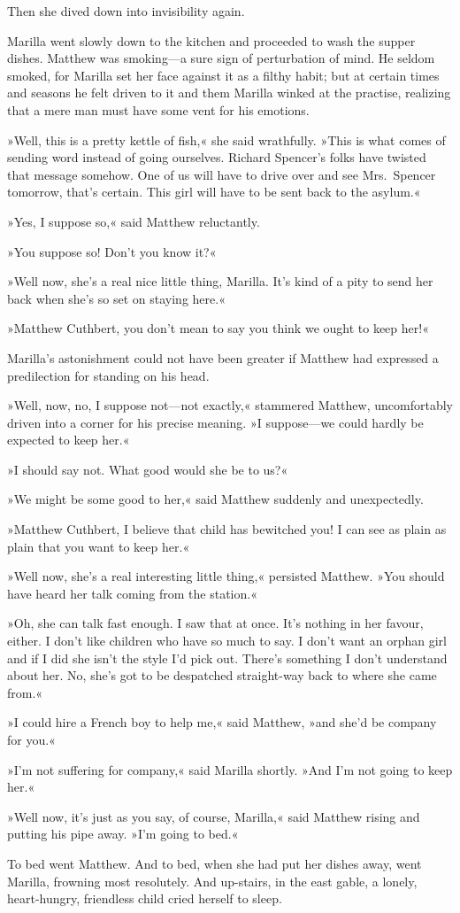 Then she dived down into invisibility again.

Marilla went slowly down to the kitchen and proceeded to wash the supper dishes. Matthew was smoking—a sure sign of perturbation of mind. He seldom smoked, for Marilla set her face against it as a filthy habit; but at certain times and seasons he felt driven to it and them Marilla winked at the practise, realizing that a mere man must have some vent for his emotions.

»Well, this is a pretty kettle of fish,« she said wrathfully. »This is what comes of sending word instead of going ourselves. Richard Spencer's folks have twisted that message somehow. One of us will have to drive over and see Mrs.~Spencer tomorrow, that's certain. This girl will have to be sent back to the asylum.«

»Yes, I suppose so,« said Matthew reluctantly.

»You suppose so! Don't you know it?«

»Well now, she's a real nice little thing, Marilla. It's kind of a pity to send her back when she's so set on staying here.«

»Matthew Cuthbert, you don't mean to say you think we ought to keep her!«

Marilla's astonishment could not have been greater if Matthew had expressed a predilection for standing on his head.

»Well, now, no, I suppose not—not exactly,« stammered Matthew, uncomfortably driven into a corner for his precise meaning. »I suppose—we could hardly be expected to keep her.«

»I should say not. What good would she be to us?«

»We might be some good to her,« said Matthew suddenly and unexpectedly.

»Matthew Cuthbert, I believe that child has bewitched you! I can see as plain as plain that you want to keep her.«

»Well now, she's a real interesting little thing,« persisted Matthew. »You should have heard her talk coming from the station.«

»Oh, she can talk fast enough. I saw that at once. It's nothing in her favour, either. I don't like children who have so much to say. I don't want an orphan girl and if I did she isn't the style I'd pick out. There's something I don't understand about her. No, she's got to be despatched straight-way back to where she came from.«

»I could hire a French boy to help me,« said Matthew, »and she'd be company for you.«

»I'm not suffering for company,« said Marilla shortly. »And I'm not going to keep her.«

»Well now, it's just as you say, of course, Marilla,« said Matthew rising and putting his pipe away. »I'm going to bed.«

To bed went Matthew. And to bed, when she had put her dishes away, went Marilla, frowning most resolutely. And up-stairs, in the east gable, a lonely, heart-hungry, friendless child cried herself to sleep.


